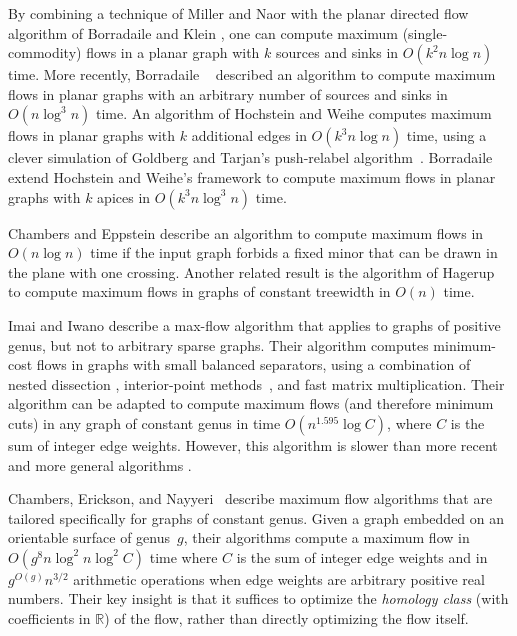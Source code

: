 \documentclass[letterpaper,review]{siamart190516}
\def\Real{\mathbb{R}}
\begin{document}
By combining a technique of Miller and Naor \cite{mn-fpgms-95} with the planar directed flow
algorithm of Borradaile and Klein \cite{b-epnfc-08, bk-tamfd-06, bk-amfdp-09, e-mfpsp-10}, one can
compute maximum (single-commodity) flows in a planar graph with $k$ sources and sinks in $O(k^2
n\log n)$ time.  More recently, Borradaile \etal~\cite{bkmnw-msmsm-17} described an algorithm to
compute maximum flows in planar graphs with an arbitrary number of sources and sinks in $O(n\log^3 n)$ time.  An algorithm of Hochstein and Weihe \cite{hw-mstfkc-07} computes maximum flows in planar graphs with $k$ additional edges in $O(k^3n\log n)$ time, using a clever simulation of Goldberg and Tarjan's push-relabel algorithm~\cite{gt-namfp-88}.  Borradaile \etal~\cite{bkmnw-msmsm-17} extend Hochstein and Weihe's framework to compute maximum flows in planar graphs with $k$ apices in $O(k^3n\log^3 n)$ time.

Chambers and Eppstein \cite{ce-focmf-13} describe an algorithm to compute maximum flows in $O(n\log n)$ time if the input graph forbids a fixed minor that can be drawn in the plane with one crossing.  Another related result is the algorithm of Hagerup \etal~\cite{hknr-cmfnc-98} to compute maximum flows in graphs of constant treewidth in $O(n)$ time.

Imai and Iwano \cite{ii-espap-90} describe a max-flow algorithm that applies to graphs of positive genus, but not to arbitrary sparse graphs.
Their algorithm computes minimum-cost flows in graphs with small balanced separators, using a combination of nested dissection \cite{lrt-gnd-79, pr-fepss-93}, interior-point methods~\cite{v-slpfm-89}, and fast matrix multiplication.
Their algorithm can be adapted to compute maximum flows (and therefore minimum cuts) in any graph of constant genus in time $O(n^{1.595}\log C)$, where $C$ is the sum of integer edge weights.
However, this algorithm is slower than more recent and more general algorithms \cite{ds-flgfi-08, gr-bfdb-98}.

Chambers, Erickson, and Nayyeri~\cite{cen-hfcc-12} describe maximum flow algorithms that are tailored specifically for graphs of constant genus.
Given a graph embedded on an orientable surface of genus~$g$, their algorithms compute a maximum flow in  $O(g^8 n \log^2 n \log^2 C)$ time where $C$ is the sum of integer edge weights and in $g^{O(g)}n^{3/2}$ arithmetic operations when edge weights are arbitrary positive real numbers.  Their key insight is that it suffices to optimize the \emph{homology class} (with coefficients in $\Real$) of the flow, rather than directly optimizing the flow itself.
\end{document}
